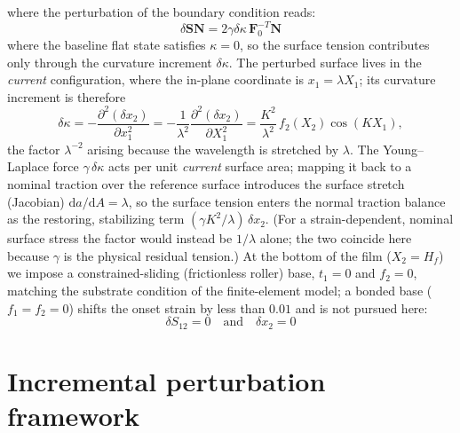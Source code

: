 \documentclass[final,3p,times]{elsarticle}
\begin{document}
where the perturbation of the boundary condition reads:
\begin{equation}
	\delta\mathbf{S}\mathbf{N}=2\gamma\delta\kappa\,\mathbf{F}^{-T}_{0}\mathbf{N}
	\label{eq:BC_gamma}
\end{equation}
where the baseline flat state satisfies $\kappa=0$, so the surface tension
contributes only through the curvature increment $\delta\kappa$. The
perturbed surface lives in the \emph{current} configuration, where the
in-plane coordinate is $x_1=\lambda X_1$; its curvature increment is
therefore
\begin{equation}
	\delta\kappa = -\frac{\partial^{2}(\delta x_2)}{\partial x_1^{2}}
	             = -\frac{1}{\lambda^{2}}\frac{\partial^{2}(\delta x_2)}{\partial X_1^{2}}
	             = \frac{K^{2}}{\lambda^{2}}\,f_2(X_2)\cos(K X_1),
	\label{eq:curv_inc}
\end{equation}
the factor $\lambda^{-2}$ arising because the wavelength is stretched by
$\lambda$. The Young--Laplace force $\gamma\,\delta\kappa$ acts per unit
\emph{current} surface area; mapping it back to a nominal traction over the
reference surface introduces the surface stretch (Jacobian)
$\mathrm{d}a/\mathrm{d}A=\lambda$, so the surface tension enters the normal
traction balance as the restoring, stabilizing term
$(\gamma K^{2}/\lambda)\,\delta x_2$. (For a strain-dependent, nominal
surface stress the factor would instead be $1/\lambda$ alone; the two
coincide here because $\gamma$ is the physical residual tension.) At the bottom of the film ($X_2 = H_f$) we impose a constrained-sliding (frictionless roller) base, $t_1=0$ and $f_2=0$, matching the substrate condition of the finite-element model; a bonded base ($f_1=f_2=0$) shifts the onset strain by less than $0.01$ and is not pursued here:
\begin{equation}
	\delta S_{12}=0 \quad \text{and} \quad \delta x_2=0
	\label{eq:BC_bottom1}
\end{equation}

\section{Incremental perturbation framework}
\label{AppexB}
\end{document}
